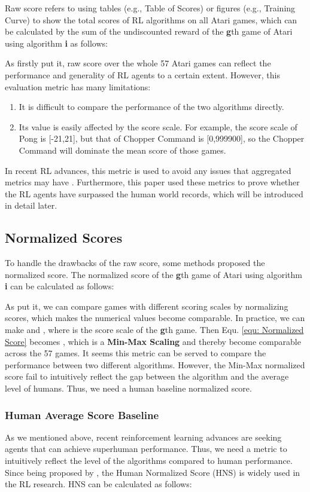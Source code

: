 \documentclass[nohyperref]{article}
\theoremstyle{plain}
\begin{document}
Raw score refers to using tables (e.g., Table of Scores) or figures (e.g., Training Curve) to show the total scores of RL algorithms on all Atari games, which can be calculated by the sum of the undiscounted reward of the \textbf{g}th game of Atari using algorithm \textbf{i} as follows:



As \citet{ale} firstly put it, raw score over the whole 57 Atari games can reflect the performance and generality of RL agents to a certain extent. However, this evaluation metric has many limitations:

\begin{enumerate}
    \item It is difficult to compare the performance of the two algorithms directly.
    \item Its value is easily affected by the score scale. For example, the score scale of Pong is [-21,21], but that of Chopper Command is [0,999900], so the Chopper Command will dominate the mean score of those games.
\end{enumerate}

In recent RL advances, this metric is used to avoid any issues that aggregated metrics may have \citep{agent57}. Furthermore, this paper used these metrics to prove whether the RL agents have surpassed the human world records, which will be introduced in detail later.

\subsection{Normalized Scores}
To handle the drawbacks of the raw score, some methods \citep{ale,dqn} proposed the normalized score. The normalized score of the \textbf{g}th game of Atari using algorithm \textbf{i} can be calculated as follows:

As \citet{ale} put it, we can compare games with different scoring scales by  normalizing scores, which makes the numerical values become comparable. In practice, we can make  and , where  is the score scale of the \textbf{g}th game. Then Equ. \eqref{equ: Normalized Score} becomes , which is a \textbf{Min-Max Scaling} and thereby  become comparable across the 57 games. It seems this metric can be served to compare the performance between two different algorithms. However, the Min-Max normalized score fail to intuitively reflect the gap between the algorithm and the average level of humans. Thus, we need a human baseline normalized score.

\subsubsection{Human Average Score Baseline}
As we mentioned above, recent reinforcement learning advances \citep{agent57,ngu,r2d2,goexplore,muzero,muesli,rainbow} are seeking agents that can achieve superhuman performance. Thus, we need a metric to intuitively reflect the level of the algorithms compared to human performance. Since being proposed by \citep{ale}, the Human Normalized Score (HNS) is widely used in the RL research\citep{ale2}. HNS can be calculated as follows:
\end{document}
